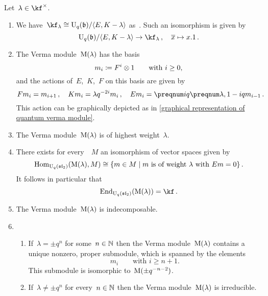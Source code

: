 \documentclass[a4paper, 11pt, oneside]{scrartcl}
\begin{document}
\begin{proposition}
  Let~$\lambda \in \kf^\times$.
  \begin{enumerate}
    \item
      We have~$\kf_\lambda \cong \Univ_q(\blie) / \gen{E, K - \lambda}$ as~.
      Such an isomorphism is given by
      \[
        \Univ_q(\blie) / \gen{E, K - \lambda}
        \to
        \kf_\lambda \,,
        \quad
        \class{x}
        \mapsto
        x.1 \,.
      \]
    \item
      The Verma module~$\operatorname{M}(\lambda)$ has the basis
      \[
        m_i
        \coloneqq
        F^i \otimes 1
        \qquad
        \text{with~$i \geq 0$,}
      \]
      and the actions of~$E$,~$K$,~$F$ on this basis are given by
      \[
        F m_i = m_{i+1} \,,
        \quad
        K m_i = \lambda q^{-2i} m_i \,,
        \quad
        E m_i = \qnum{i} \qnum{\lambda, 1-i} m_{i-1} \,.
      \]
      This action can be graphically depicted as in \cref{graphical representation of quantum verma module}.
    \item
      The Verma module~$\operatorname{M}(\lambda)$ is of highest weight~$\lambda$.
    \item
      There exists for every~~$M$ an isomorphism of vector spaces given by
      \[
        \Hom_{\Univ_q(\sllie_2)}( \verma(\lambda), M )
        \cong
        \{
          m \in M
        \suchthat
          \text{$m$ is of weight~$\lambda$ with~$Em = 0$}
        \} \,.
      \]
      It follows in particular that
      \[
        \End_{\Univ_q(\sllie_2)}( \verma(\lambda) )
        =
        \kf \,.
      \]
    \item
      The Verma module~$\operatorname{M}(\lambda)$ is indecomposable.
    \item
      \begin{enumerate}
        \item
          If~$\lambda = \pm q^n$ for some~$n \in \mathbb{N}$ then the Verma module~$\operatorname{M}(\lambda)$ contains a unique nonzero, proper submodule, which is spanned by the elements
          \[
            m_i
            \qquad
            \text{with~$i \geq n+1$.}
          \]
          This submodule is isomorphic to~$\operatorname{M}(\pm q^{-n-2})$.
        \item
          If~$\lambda \neq \pm q^n$ for every~$n \in \mathbb{N}$ then the Verma module~$\operatorname{M}(\lambda)$ is irreducible.
      \end{enumerate}
  \end{enumerate}
\end{proposition}
\end{document}
